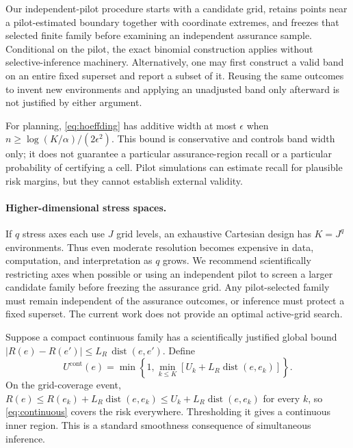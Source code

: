 \documentclass[twoside,11pt]{article}
\newcommand{\dist}{\operatorname{dist}}
\begin{document}
Our independent-pilot procedure starts with a candidate grid, retains points near a
pilot-estimated boundary together with coordinate extremes, and freezes that selected finite
family before examining an independent assurance sample. Conditional on the pilot, the exact
binomial construction applies without selective-inference machinery. Alternatively, one may
first construct a valid band on an entire fixed superset and report a subset of it. Reusing the
same outcomes to invent new environments and applying an unadjusted band only afterward is
not justified by either argument.

For planning, \eqref{eq:hoeffding} has additive width at most $\epsilon$ when
$n\geq\log(K/\alpha)/(2\epsilon^2)$. This bound is conservative and controls band width
only; it does not guarantee a particular assurance-region recall or a particular probability of
certifying a cell. Pilot simulations can estimate recall for plausible risk margins, but they
cannot establish external validity.

\paragraph{Higher-dimensional stress spaces.}
If $q$ stress axes each use $J$ grid levels, an exhaustive Cartesian design has
$K=J^q$ environments. Thus even moderate resolution becomes expensive in data, computation,
and interpretation as $q$ grows. We recommend scientifically restricting axes when possible or
using an independent pilot to screen a larger candidate family before freezing the assurance
grid. Any pilot-selected family must remain independent of the assurance outcomes, or inference
must protect a fixed superset. The current work does not provide an optimal active-grid search.

Suppose a compact continuous family has a scientifically justified global bound
$|R(e)-R(e')|\leq L_R\,\dist(e,e')$. Define
\begin{equation}
U^{\mathrm{cont}}(e)=\min\left\{1,\min_{k\leq K}[U_k+L_R\dist(e,e_k)]\right\}.
\label{eq:continuous}
\end{equation}
On the grid-coverage event, $R(e)\leq R(e_k)+L_R\dist(e,e_k)\leq U_k+L_R\dist(e,e_k)$ for
every $k$, so \eqref{eq:continuous} covers the risk everywhere. Thresholding it gives a
continuous inner region. This is a standard smoothness consequence of simultaneous inference.
\end{document}
